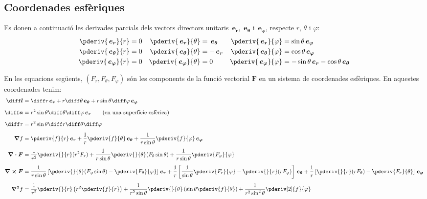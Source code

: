 \documentclass[catalan,a4paper,twoside,11pt]{article}
\begin{document}
\subsection{Coordenades esfèriques}

\renewcommand{\va}{\ensuremath{\,\boldsymbol{e_r}}}
\renewcommand{\vb}{\ensuremath{\,\boldsymbol{e_\theta}}}
\renewcommand{\vc}{\ensuremath{\,\boldsymbol{e_\varphi}}}

Es donen a continuació les derivades parcials dels vectors directors unitaris $\va$, $\vb$ i $\vc$, respecte  $r$, $\theta$ i $\varphi$:
\begin{subequations}
\begin{align}
   \pderiv{\va}{r} &= 0 & \pderiv{\va}{\theta} &= \vb  & \pderiv{\va}{\varphi} &= \sin\theta\vc \\
   \pderiv{\vb}{r} &= 0 & \pderiv{\vb}{\theta} &= -\va & \pderiv{\vb}{\varphi} &= \cos\theta\vc \\
   \pderiv{\vc}{r} &= 0 & \pderiv{\vc}{\theta} &= 0    & \pderiv{\vc}{\varphi} &= -\sin\theta\va-\cos\theta\vb
\end{align}
\end{subequations}

En les equacions següents, $(F_r,F_\theta,F_\varphi)$  són
les components de la funció  vectorial  $\boldsymbol{F}$ en un sistema de
coordenades esfèriques. En aquestes coordenades tenim:
\begin{align}
    \boldsymbol{\diff l} &= \diff r \va + r\diff\theta \vb + r \sin\theta\diff \varphi \vc\\[1ex]
    \boldsymbol{\diff a} &= r^2 \sin\theta \diff \theta \diff \varphi \va\qquad\text{(en una superfície esfèrica)}\\[1ex]
    \diff\tau &= r^2 \sin\theta\diff r \diff \theta \diff \varphi\\[1ex]
    \boldsymbol{\nabla}f &= \pderiv{f}{r}\va + \frac{1}{r}\pderiv{f}{\theta}\vb
    + \frac{1}{r\sin\theta}\pderiv{f}{\varphi}\vc\\[1ex]
    \boldsymbol{\nabla\cdot F} &= \frac{1}{r^2}\pderiv{}{r}(r^2 F_r) +
    \frac{1}{r\sin\theta}\pderiv{}{\theta}(F_\theta\sin\theta)+
    \frac{1}{r\sin\theta}\pderiv{F_\varphi}{\varphi}\\[1ex]
    \boldsymbol{\nabla\times F} &= \frac{1}{r\sin\theta}\left[\pderiv{}{\theta}
    (F_\varphi\sin\theta)-\pderiv{F_\theta}{\varphi}\right]\va +
    \frac{1}{r}\left[\frac{1}{\sin\theta}\pderiv{F_r}{\varphi}-
    \pderiv{}{r}(r F_\varphi)\right]\vb +\frac{1}{r}\left[\pderiv{}{r}(r F_\theta)-\pderiv{F_r}{\theta}\right]\vc\\[1ex]
    \boldsymbol{\nabla^2}f &= \frac{1}{r^2}\pderiv{}{r}\left(r^2\pderiv{f}{r}
    \right) + \frac{1}{r^2\sin\theta}\pderiv{}{\theta}\left(\sin\theta\pderiv{f}{\theta}\right) +
    \frac{1}{r^2\sin^2\theta}\pderiv[2]{f}{\varphi}
\end{align}
\end{document}
